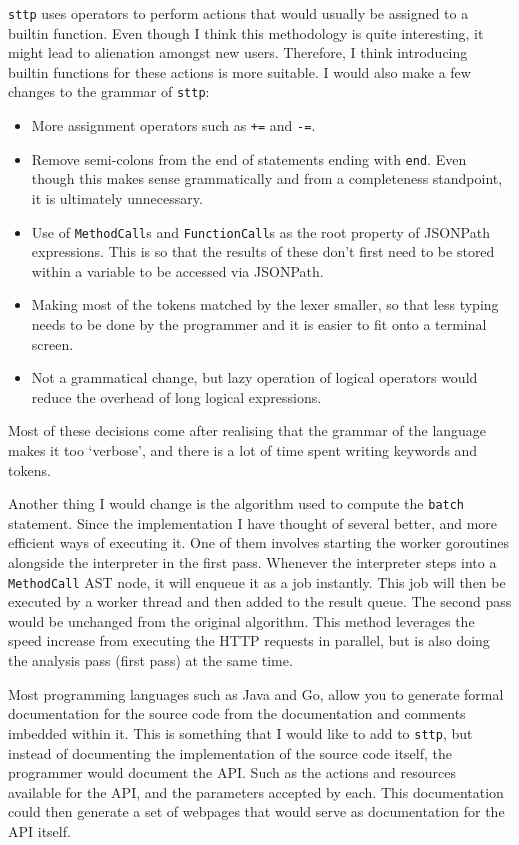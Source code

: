 \documentclass[]{full}
\theoremstyle{definition}
\begin{document}
\verb|sttp| uses operators to perform actions that would usually be assigned to a builtin function. Even though I think this methodology is quite interesting, it might lead to alienation amongst new users. Therefore, I think introducing builtin functions for these actions is more suitable. I would also make a few changes to the grammar of \verb|sttp|:

\begin{itemize}
    \item More assignment operators such as \verb|+=| and \verb|-=|.
    \item Remove semi-colons from the end of statements ending with \verb|end|. Even though this makes sense grammatically and from a completeness standpoint, it is ultimately unnecessary.
    \item Use of \verb|MethodCall|s and \verb|FunctionCall|s as the root property of JSONPath expressions. This is so that the results of these don't first need to be stored within a variable to be accessed via JSONPath.
    \item Making most of the tokens matched by the lexer smaller, so that less typing needs to be done by the programmer and it is easier to fit onto a terminal screen.
    \item Not a grammatical change, but lazy operation of logical operators would reduce the overhead of long logical expressions.
\end{itemize}

Most of these decisions come after realising that the grammar of the language makes it too `verbose', and there is a lot of time spent writing keywords and tokens.

Another thing I would change is the algorithm used to compute the \verb|batch| statement. Since the implementation I have thought of several better, and more efficient ways of executing it. One of them involves starting the worker goroutines alongside the interpreter in the first pass. Whenever the interpreter steps into a \verb|MethodCall| AST node, it will enqueue it as a job instantly. This job will then be executed by a worker thread and then added to the result queue. The second pass would be unchanged from the original algorithm. This method leverages the speed increase from executing the HTTP requests in parallel, but is also doing the analysis pass (first pass) at the same time.

Most programming languages such as Java and Go, allow you to generate formal documentation for the source code from the documentation and comments imbedded within it. This is something that I would like to add to \verb|sttp|, but instead of documenting the implementation of the source code itself, the programmer would document the API. Such as the actions and resources available for the API, and the parameters accepted by each. This documentation could then generate a set of webpages that would serve as documentation for the API itself.
\end{document}
